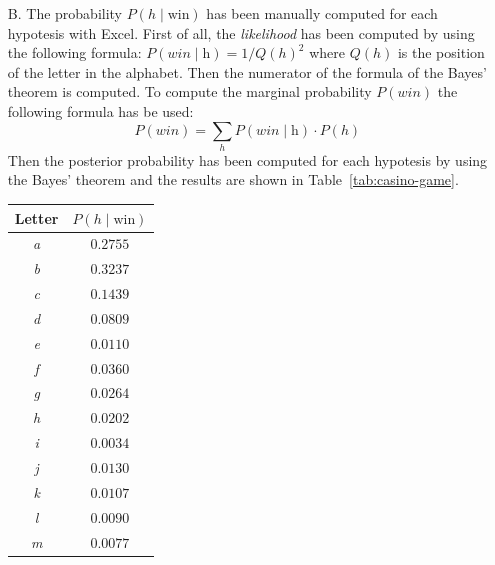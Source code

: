 \begin{itemize}
    \item[B.] The probability $P(h\;|\;\text{win})$ has been manually computed for each hypotesis with Excel. First of all, the
        \textit{likelihood} has been computed by using the following formula: $P(win\;|\;\text{h}) = 1/Q(h)^{2}$ where $Q(h)$ is
        the position of the letter in the alphabet. Then the numerator of the formula of the Bayes' theorem is computed.
        To compute the marginal probability $P(win)$ the following formula has be used:
        \[ P(win) = \sum_{h} P(win\;|\;\text{h}) \cdot P(h)\]
        Then the posterior probability has been computed for each hypotesis by using the Bayes' theorem and the results are shown
        in Table~\ref{tab:casino-game}.
        \begin{table}[H]
            \centering
            \begin{minipage}{.4\linewidth}
                \centering
                \begin{tabular}{c c}
                    \hline
                    \textbf{Letter} & $P(h\;|\;\text{win})$ \\
                    \hline
                    \textit{a} & $0.2755$ \\
                    \textit{b} & $0.3237$ \\
                    \textit{c} & $0.1439$ \\
                    \textit{d} & $0.0809$ \\
                    \textit{e} & $0.0110$ \\
                    \textit{f} & $0.0360$ \\
                    \textit{g} & $0.0264$ \\
                    \textit{h} & $0.0202$ \\
                    \textit{i} & $0.0034$ \\
                    \textit{j} & $0.0130$ \\
                    \textit{k} & $0.0107$ \\
                    \textit{l} & $0.0090$ \\
                    \textit{m} & $0.0077$ \\
                    \hline
                \end{tabular}
            \end{minipage}
            \begin{minipage}{.4\linewidth}
                \centering
                \begin{tabular}{c c}

\end{tabular}
\end{minipage}
\end{table}
\end{itemize}
